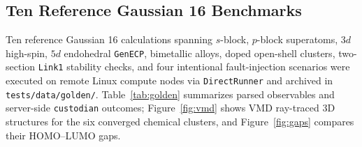 \documentclass[journal=jcisd8,manuscript=article]{achemso}
\begin{document}
\subsection{Ten Reference Gaussian 16 Benchmarks}

Ten reference Gaussian 16 calculations spanning $s$-block, $p$-block superatoms, $3d$ high-spin, $5d$ endohedral \texttt{GenECP}, bimetallic alloys, doped open-shell clusters, two-section \texttt{Link1} stability checks, and four intentional fault-injection scenarios were executed on remote Linux compute nodes via \texttt{DirectRunner} and archived in \texttt{tests/data/golden/}. Table~\ref{tab:golden} summarizes parsed observables and server-side \texttt{custodian} outcomes; Figure~\ref{fig:vmd} shows VMD ray-traced 3D structures for the six converged chemical clusters, and Figure~\ref{fig:gaps} compares their HOMO--LUMO gaps.
\end{document}
